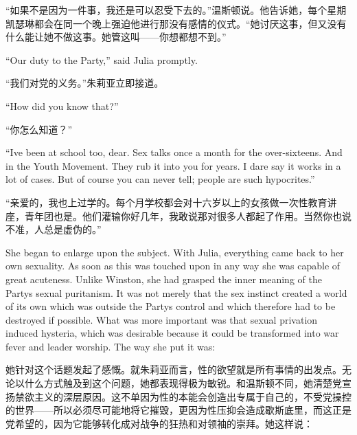 \begin{paracol}{2}
\switchcolumn

``如果不是因为一件事，我还是可以忍受下去的。''温斯顿说。他告诉她，每个星期凯瑟琳都会在同一个晚上强迫他进行那没有感情的仪式。``她讨厌这事，但又没有什么能让她不做这事。她管这叫——你想都想不到。''

\switchcolumn*

``Our duty to the Party,'' said Julia promptly.

\switchcolumn

``我们对党的义务。''朱莉亚立即接道。

\switchcolumn*

``How did you know that?''

\switchcolumn

``你怎么知道？''

\switchcolumn*

``I\textquotesingle ve been at school too, dear. Sex talks once a month
for the over-sixteens. And in the Youth Movement. They rub it into you
for years. I dare say it works in a lot of cases. But of course you can
never tell; people are such hypocrites.''

\switchcolumn

``亲爱的，我也上过学的。每个月学校都会对十六岁以上的女孩做一次性教育讲座，青年团也是。他们灌输你好几年，我敢说那对很多人都起了作用。当然你也说不准，人总是虚伪的。''

\switchcolumn*

She began to enlarge upon the subject. With Julia, everything came back
to her own sexuality. As soon as this was touched upon in any way she
was capable of great acuteness. Unlike Winston, she had grasped the
inner meaning of the Party\textquotesingle s sexual puritanism. It was
not merely that the sex instinct created a world of its own which was
outside the Party\textquotesingle s control and which therefore had to
be destroyed if possible. What was more important was that sexual
privation induced hysteria, which was desirable because it could be
transformed into war fever and leader worship. The way she put it was:

\switchcolumn

她针对这个话题发起了感慨。就朱莉亚而言，性的欲望就是所有事情的出发点。无论以什么方式触及到这个问题，她都表现得极为敏锐。和温斯顿不同，她清楚党宣扬禁欲主义的深层原因。这不单因为性的本能会创造出专属于自己的，不受党操控的世界——所以必须尽可能地将它摧毁，更因为性压抑会造成歇斯底里，而这正是党希望的，因为它能够转化成对战争的狂热和对领袖的崇拜。她这样说：

\switchcolumn*


\end{paracol}
